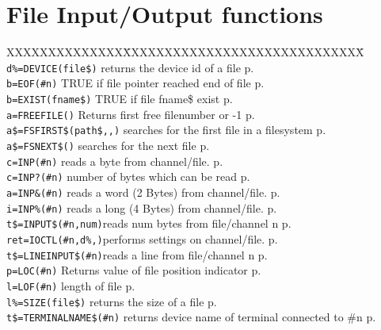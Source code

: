 \section{File Input/Output functions}
\begin{tabbing}
XXXXXXXXXXXXXX\=XXXXXXXXXXXXXXXXXXXXXXXXXXXXX\=\kill\\
\verb|d%=DEVICE(file$)|	\>returns the device id of a file \> p.\pageref{DEVICE}\\
\verb|b=EOF(#n)|	\>TRUE if file pointer reached end of file\> p.\pageref{EOF}\\
\verb|b=EXIST(fname$)| 	\>TRUE if file fname\$ exist\> p.\pageref{EXIST}\\
\verb|a=FREEFILE()|	\>Returns first free filenumber or -1\> p.\pageref{FREEFILE}\\
\verb|a$=FSFIRST$(path$,,)| \>searches for the first file in a filesystem\> p.\pageref{FSFIRSTS}\\
\verb|a$=FSNEXT$()|  	\>searches for the next file\> p.\pageref{FSNEXTS}\\
\verb|c=INP(#n)|	\>reads a byte  from channel/file.\> p.\pageref{INP}\\
\verb|c=INP?(#n)|	\>number of bytes which can be read \> p.\pageref{INPf}\\
\verb|a=INP&(#n)|	\>reads a word (2 Bytes) from channel/file.\> p.\pageref{INPu}\\
\verb|i=INP%(#n)|	\>reads a long (4 Bytes) from channel/file.\> p.\pageref{INPi}\\
\verb|t$=INPUT$(#n,num)|\>reads num bytes from file/channel n\> p.\pageref{INPUTS}\\
\verb|ret=IOCTL(#n,d%,)|\>performs settings on channel/file.\> p.\pageref{IOCTL}\\
\verb|t$=LINEINPUT$(#n)|\>reads a line from file/channel n\> p.\pageref{LINEINPUTS}\\
\verb|p=LOC(#n)|	\>Returns value of file position indicator\> p.\pageref{LOC}\\
\verb|l=LOF(#n)|	\>length of file\> p.\pageref{LOF}\\
\verb|l%=SIZE(file$)|	\>returns the size of a file \> p.\pageref{SIZE}\\
\verb|t$=TERMINALNAME$(#n)| \>	returns device name of terminal connected to \#n\> p.\pageref{TERMINALNAMES}\\
\end{tabbing}

